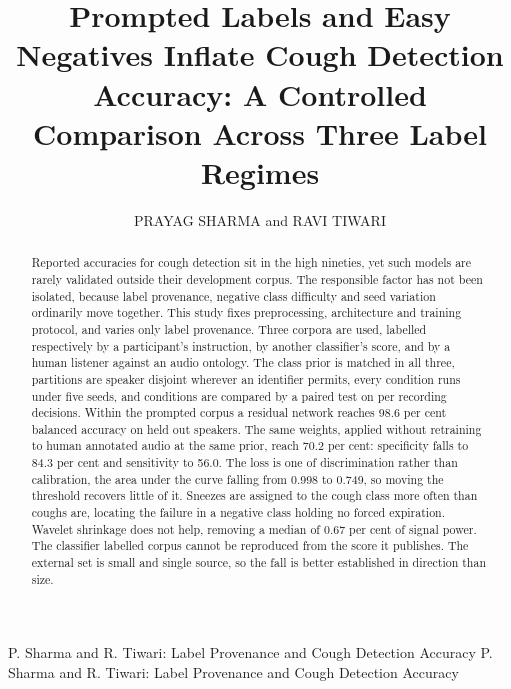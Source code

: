 \documentclass{ieeeaccess}
\begin{document}

\title{Prompted Labels and Easy Negatives Inflate Cough Detection Accuracy: A Controlled
Comparison Across Three Label Regimes}
\author{\uppercase{Prayag Sharma} and \uppercase{Ravi Tiwari}}
\address[1]{School of Computer Science and Engineering (SCOPE), Vellore Institute of Technology (VIT), Chennai, Tamil Nadu, India (e-mail: prayag.sharma2024@vitstudent.ac.in)}
\address[2]{School of Electronics Engineering (SENSE), Vellore Institute of Technology (VIT), Chennai, Tamil Nadu, India (e-mail: ravi.tiwari@vit.ac.in)}

\markboth
{P. Sharma and R. Tiwari: Label Provenance and Cough Detection Accuracy}
{P. Sharma and R. Tiwari: Label Provenance and Cough Detection Accuracy}


\begin{abstract}
Reported accuracies for cough detection sit in the high nineties, yet such
models are rarely validated outside their development corpus. The responsible factor has
not been isolated, because label provenance, negative class difficulty and seed variation
ordinarily move together. This study fixes preprocessing, architecture and training
protocol, and varies only label provenance. Three corpora are used, labelled respectively
by a participant's instruction, by another classifier's score, and by a human listener
against an audio ontology. The class prior is matched in all three, partitions are speaker
disjoint wherever an identifier permits, every condition runs under five seeds, and
conditions are compared by a paired test on per recording decisions. Within the prompted
corpus a residual network reaches 98.6 per cent balanced accuracy on held out speakers.
The same weights, applied without retraining to human annotated audio at the same prior,
reach 70.2 per cent: specificity falls to 84.3 per cent and sensitivity to 56.0. The loss
is one of discrimination rather than calibration, the area under the curve falling from
0.998 to 0.749, so moving the threshold recovers little of it. Sneezes are assigned to the
cough class more often than coughs are, locating the failure in a negative class holding
no forced expiration. Wavelet shrinkage does not help, removing a median of 0.67 per cent
of signal power. The classifier labelled corpus cannot be reproduced from the score it
publishes. The external set is small and single source, so the fall is better established
in direction than size.
\end{abstract}
\end{document}
